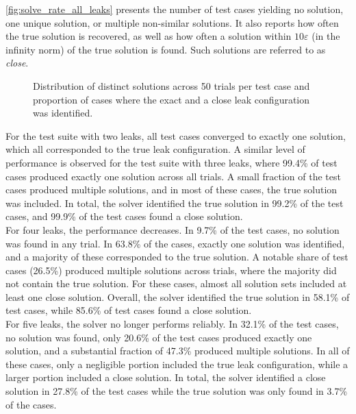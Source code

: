 \autoref{fig:solve_rate_all_leaks} presents the number of test cases yielding no solution, one unique solution, or multiple non-similar solutions. It also reports how often the true solution is recovered, as well as how often a solution within $10\varepsilon$ (in the infinity norm) of the true solution is found. Such solutions are referred to as \emph{close}.\\

\begin{figure}[ht]
    \centering
    
    \caption[Distribution of distinct solutions across 50 trials per test case]{Distribution of distinct solutions across 50 trials per test case and proportion of cases where the exact and a close leak configuration was identified.}
    \label{fig:solve_rate_all_leaks}
\end{figure}

For the test suite with two leaks, all test cases converged to exactly one solution, which all corresponded to the true leak configuration. A similar level of performance is observed for the test suite with three leaks, where 99.4\% of test cases produced exactly one solution across all trials. A small fraction of the test cases produced multiple solutions, and in most of these cases, the true solution was included. In total, the solver identified the true solution in 99.2\% of the test cases, and 99.9\% of the test cases found a close solution.\\

For four leaks, the performance decreases. In 9.7\% of the test cases, no solution was found in any trial. In 63.8\% of the cases, exactly one solution was identified, and a majority of these corresponded to the true solution. A notable share of test cases (26.5\%) produced multiple solutions across trials, where the majority did not contain the true solution. For these cases, almost all solution sets included at least one close solution. Overall, the solver identified the true solution in 58.1\% of test cases, while 85.6\% of test cases found a close solution.\\

For five leaks, the solver no longer performs reliably. In 32.1\% of the test cases, no solution was found, only 20.6\% of the test cases produced exactly one solution, and a substantial fraction of 47.3\% produced multiple solutions. In all of these cases, only a negligible portion included the true leak configuration, while a larger portion included a close solution. In total, the solver identified a close solution in 27.8\% of the test cases while the true solution was only found in 3.7\% of the cases.\\


